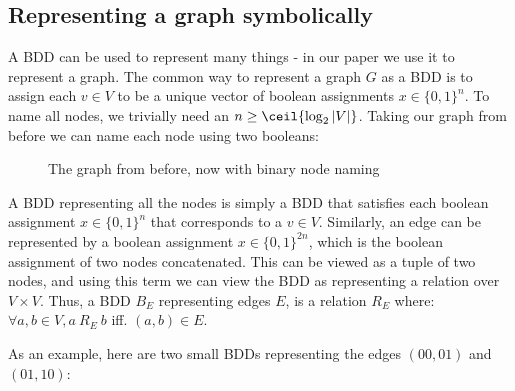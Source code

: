 \documentclass[../master/master.tex]{subfiles}
\begin{document}
\subsection{Representing a graph symbolically}
A BDD can be used to represent many things - in our paper we use it to represent a graph. The common way to represent a graph $G$ as a BDD is to assign each $v\in V$ to be a unique vector of boolean assignments $x\in\{0,1\}^n$. To name all nodes, we trivially need an $n \geq \ceil{\log_2{|V|}}$. Taking our graph from before we can name each node using two booleans:

\begin{figure}[H]
\center
{}
\caption{The graph from before, now with binary node naming}
\label{graphforbdd}
\end{figure}

A BDD representing all the nodes is simply a BDD that satisfies each boolean assignment $x\in\{0,1\}^n$ that corresponds to a $v\in V$. Similarly, an edge can be represented by a boolean assignment $x\in\{0,1\}^{2n}$, which is the boolean assignment of two nodes concatenated. This can be viewed as a tuple of two nodes, and  using this term we can view the BDD as representing a relation over $V\times V$. 
Thus, a BDD $B_E$ representing edges $E$, is a relation $R_E$ where: $\forall a, b \in V, a\ R_E\ b$ iff. $(a,b)\in E$.

As an example, here are two small BDDs representing the edges $(00,01)$ and $(01,10)$:
\end{document}
